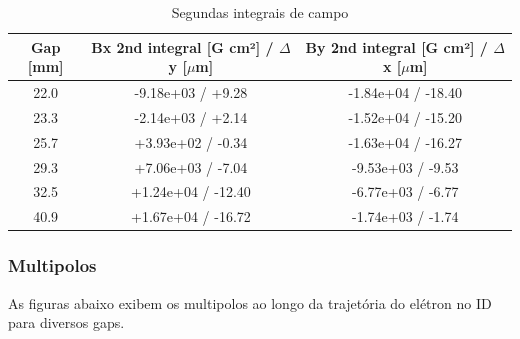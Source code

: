 \documentclass[a4paper,12pt]{article}
\begin{document}
\begin{table}[H]
\centering
\caption{Segundas integrais de campo}
\begin{tabular}{|c|c|c|}
\hline
   Gap [mm] & Bx 2nd integral [G cm²] / $\Delta$ y [$\mu$m] & By 2nd integral [G cm²] / $\Delta$ x [$\mu$m]   \\
\hline
    22.0 & -9.18e+03 / +9.28 & -1.84e+04 / -18.40 \\
    23.3 & -2.14e+03 / +2.14 & -1.52e+04 / -15.20 \\
    25.7 & +3.93e+02 / -0.34 & -1.63e+04 / -16.27 \\
    29.3 & +7.06e+03 / -7.04 & -9.53e+03 / -9.53 \\
    32.5 & +1.24e+04 / -12.40 & -6.77e+03 / -6.77 \\
    40.9 & +1.67e+04 / -16.72 & -1.74e+03 / -1.74 \\
\hline
\end{tabular}
\end{table}

\subsubsection{Multipolos}
As figuras abaixo exibem os multipolos ao longo da trajetória do elétron no ID para diversos gaps.
\end{document}
